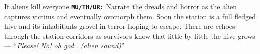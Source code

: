 \begin{rpg-commentbox}{If aliens kill everyone}
    \texttt{\textbf{MU/TH/UR:}} Narrate the dreads and horror as the alien captures victims and eventually ovomorph them. Soon the station is a full fledged hive and its inhabitants grovel in terror hoping to escape. There are echoes through the station corridors as survivors know that little by little the hive grows --- ``\textit{Please! No! oh god.. (alien sound)}''
\end{rpg-commentbox}